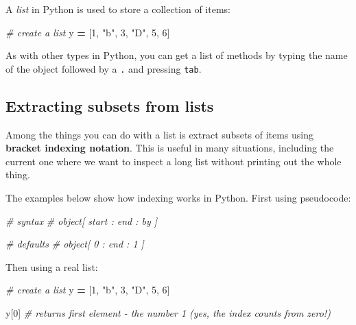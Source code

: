 \documentclass[
]{book}
\newenvironment{Shaded}{\begin{snugshade}}{\end{snugshade}}
\newcommand{\CommentTok}[1]{\textcolor[rgb]{0.56,0.35,0.01}{\textit{#1}}}
\newcommand{\DecValTok}[1]{\textcolor[rgb]{0.00,0.00,0.81}{#1}}
\newcommand{\NormalTok}[1]{#1}
\newcommand{\OperatorTok}[1]{\textcolor[rgb]{0.81,0.36,0.00}{\textbf{#1}}}
\newcommand{\StringTok}[1]{\textcolor[rgb]{0.31,0.60,0.02}{#1}}
\begin{document}
A \emph{list} in Python is used to store a collection of items:

\begin{Shaded}
\begin{Highlighting}[]
\CommentTok{\# create a list}
\NormalTok{y }\OperatorTok{=}\NormalTok{ [}\DecValTok{1}\NormalTok{, }\StringTok{"b"}\NormalTok{, }\DecValTok{3}\NormalTok{, }\StringTok{"D"}\NormalTok{, }\DecValTok{5}\NormalTok{, }\DecValTok{6}\NormalTok{]}
\end{Highlighting}
\end{Shaded}

As with other types in Python, you can get a list of methods by typing the name of the object followed by a \texttt{.} and pressing \texttt{tab}.

\hypertarget{extracting-subsets-from-lists}{%
\subsection{Extracting subsets from lists}\label{extracting-subsets-from-lists}}

Among the things you can do with a list is extract subsets of items using \textbf{bracket indexing notation}. This is useful in many situations, including the current one where we want to inspect a long list without printing out the whole thing.

The examples below show how indexing works in Python. First using pseudocode:

\begin{Shaded}
\begin{Highlighting}[]
\CommentTok{\# syntax}
\CommentTok{\# object[ start : end : by ]}

\CommentTok{\# defaults}
\CommentTok{\# object[ 0 : end : 1 ]}
\end{Highlighting}
\end{Shaded}

Then using a real list:

\begin{Shaded}
\begin{Highlighting}[]
\CommentTok{\# create a list}
\NormalTok{y }\OperatorTok{=}\NormalTok{ [}\DecValTok{1}\NormalTok{, }\StringTok{"b"}\NormalTok{, }\DecValTok{3}\NormalTok{, }\StringTok{"D"}\NormalTok{, }\DecValTok{5}\NormalTok{, }\DecValTok{6}\NormalTok{]}

\NormalTok{y[}\DecValTok{0}\NormalTok{] }\CommentTok{\# returns first element {-} the number 1 (yes, the index counts from zero!)}
\end{Highlighting}
\end{Shaded}
\end{document}
